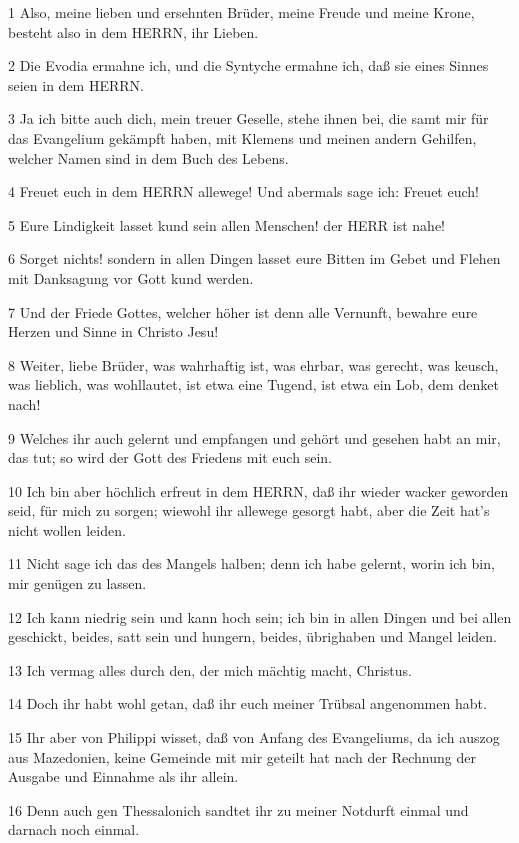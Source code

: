 \par 1 Also, meine lieben und ersehnten Brüder, meine Freude und meine Krone, besteht also in dem HERRN, ihr Lieben.
\par 2 Die Evodia ermahne ich, und die Syntyche ermahne ich, daß sie eines Sinnes seien in dem HERRN.
\par 3 Ja ich bitte auch dich, mein treuer Geselle, stehe ihnen bei, die samt mir für das Evangelium gekämpft haben, mit Klemens und meinen andern Gehilfen, welcher Namen sind in dem Buch des Lebens.
\par 4 Freuet euch in dem HERRN allewege! Und abermals sage ich: Freuet euch!
\par 5 Eure Lindigkeit lasset kund sein allen Menschen! der HERR ist nahe!
\par 6 Sorget nichts! sondern in allen Dingen lasset eure Bitten im Gebet und Flehen mit Danksagung vor Gott kund werden.
\par 7 Und der Friede Gottes, welcher höher ist denn alle Vernunft, bewahre eure Herzen und Sinne in Christo Jesu!
\par 8 Weiter, liebe Brüder, was wahrhaftig ist, was ehrbar, was gerecht, was keusch, was lieblich, was wohllautet, ist etwa eine Tugend, ist etwa ein Lob, dem denket nach!
\par 9 Welches ihr auch gelernt und empfangen und gehört und gesehen habt an mir, das tut; so wird der Gott des Friedens mit euch sein.
\par 10 Ich bin aber höchlich erfreut in dem HERRN, daß ihr wieder wacker geworden seid, für mich zu sorgen; wiewohl ihr allewege gesorgt habt, aber die Zeit hat's nicht wollen leiden.
\par 11 Nicht sage ich das des Mangels halben; denn ich habe gelernt, worin ich bin, mir genügen zu lassen.
\par 12 Ich kann niedrig sein und kann hoch sein; ich bin in allen Dingen und bei allen geschickt, beides, satt sein und hungern, beides, übrighaben und Mangel leiden.
\par 13 Ich vermag alles durch den, der mich mächtig macht, Christus.
\par 14 Doch ihr habt wohl getan, daß ihr euch meiner Trübsal angenommen habt.
\par 15 Ihr aber von Philippi wisset, daß von Anfang des Evangeliums, da ich auszog aus Mazedonien, keine Gemeinde mit mir geteilt hat nach der Rechnung der Ausgabe und Einnahme als ihr allein.
\par 16 Denn auch gen Thessalonich sandtet ihr zu meiner Notdurft einmal und darnach noch einmal.
